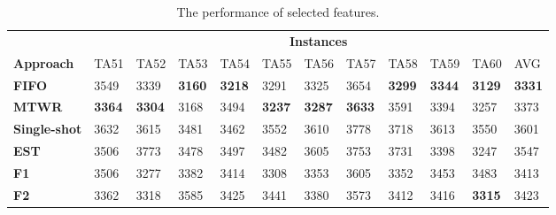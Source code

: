 \documentclass[runningheads]{llncs}
\begin{document}
\begin{table}[bt]
  \begin{center}
    \caption{The performance of selected features.}
    \label{tab4}

    \begin{tabular}{|l|l|l|l|l|l|l|l|l|l|l|l|} \hline
      & \multicolumn{11}{|c|}{\textbf{Instances}} \\ \cline{2-12}
      \textbf{Approach}   & TA51                           & TA52                           & TA53                           & TA54 & TA55                           & TA56                           & TA57                           & TA58 & TA59                           & TA60 & AVG  \\ \hline
      \textbf{FIFO}        & 3549                           & 3339                           & \textbf{3160}              & \textbf{3218} & 3291               & 3325                           & 3654                           & \textbf{3299} & \textbf{3344}                           & \textbf{3129} & \textbf{3331} \\
      \textbf{MTWR}        & \textbf{3364}           & \textbf{3304}              & 3168                           & 3494 & \textbf{3237}                           & \textbf{3287}               & \textbf{3633}              & 3591 & 3394                           & 3257 & 3373 \\
      \textbf{Single-shot} & 3632                           & 3615                           & 3481                           & 3462 & 3552                           & 3610                           & 3778                           & 3718 & 3613                           & 3550 & 3601 \\
      \textbf{EST}         & 3506                           & 3773                           & 3478                           & 3497 & 3482                           & 3605                           & 3753                           & 3731 & 3398                           & 3247 & 3547 \\ \hline
      \textbf{F1}          & 3506                           & 3277                           & 3382                           & 3414 & 3308                           & 3353                           & 3605                           & 3352 & 3453                           & 3483 & 3413 \\
      \textbf{F2}          & 3362                           & 3318                           & 3585                           & 3425 & 3441                           & 3380                           & 3573                           & 3412 & 3416                           & \textbf{3315} & 3423 \\

\end{tabular}
\end{center}
\end{table}
\end{document}
